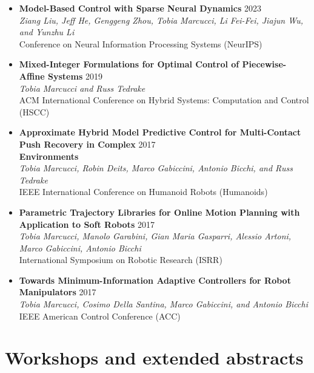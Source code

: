\documentclass[11pt,a4paper,sans]{moderncv}
\begin{document}
\begin{itemize}
\item \textbf{Model-Based Control with Sparse Neural Dynamics} \hfill 2023 \\
\textit{Ziang Liu, Jeff He, Genggeng Zhou, Tobia Marcucci, Li Fei-Fei, Jiajun Wu, and Yunzhu Li} \\
Conference on Neural Information Processing Systems (NeurIPS)

\item \textbf{Mixed-Integer Formulations for Optimal Control of Piecewise-Affine Systems} \hfill 2019 \\
\textit{Tobia Marcucci and Russ Tedrake} \\
ACM International Conference on Hybrid Systems: Computation and Control (HSCC)

\item \textbf{Approximate Hybrid Model Predictive Control for Multi-Contact Push Recovery in Complex} \hfill 2017 \\
\textbf{Environments} \\
\textit{Tobia Marcucci, Robin Deits, Marco Gabiccini, Antonio Bicchi, and Russ Tedrake} \\
IEEE International Conference on Humanoid Robots (Humanoids)

\item \textbf{Parametric Trajectory Libraries for Online Motion Planning with Application to Soft Robots} \hfill 2017 \\
\textit{Tobia Marcucci, Manolo Garabini, Gian Maria Gasparri, Alessio Artoni, Marco Gabiccini, Antonio Bicchi} \\
International Symposium on Robotic Research (ISRR)

\item \textbf{Towards Minimum-Information Adaptive Controllers for Robot Manipulators} \hfill 2017 \\
\textit{Tobia Marcucci, Cosimo Della Santina, Marco Gabiccini, and Antonio Bicchi} \\
IEEE American Control Conference (ACC)

\end{itemize}

\section{Workshops and extended abstracts}

\vspace{5pt}
\end{document}
